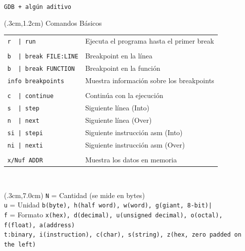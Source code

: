 \documentclass[usenames,table,dvipsnames,aspectratio=169]{beamer}
\begin{document}
\begin{frame}[fragile]{\texttt{GDB + algún aditivo}}
 \begin{textblock*}{\textwidth}(.3cm,1.2cm)
    Comandos Básicos\\
\small
\begin{tabular}{ll}
\verb;r  | run;            & Ejecuta el programa hasta el primer break\\
& \\
\verb;b  | break FILE:LINE;& Breakpoint en la línea\\
\verb;b  | break FUNCTION; & Breakpoint en la función\\
\verb;info breakpoints;    & Muestra información sobre los breakpoints\\
& \\
\verb;c  | continue;       & Continúa con la ejecución\\
\verb;s  | step;           & Siguiente línea (Into)\\
\verb;n  | next;           & Siguiente línea (Over)\\
\verb;si | stepi;          & Siguiente instrucción asm (Into)\\
\verb;ni | nexti;          & Siguiente instrucción asm (Over)\\
& \\
\verb;x/Nuf ADDR;          & Muestra los datos en memoria\\ %
  \end{tabular}\\
 \end{textblock*}
 \begin{textblock*}{\textwidth}(.3cm,7.0cm)
  \scriptsize
\hspace{.5cm} \verb;N; = Cantidad (se mide en bytes)\\
\hspace{.5cm} \verb;u; = Unidad \verb;b(byte), h(half word), w(word), g(giant, 8-bit)|;\\
\hspace{.5cm} \verb;f; = Formato \verb;x(hex), d(decimal), u(unsigned decimal), o(octal), f(float), a(address);\\
\hspace{2.1cm} \verb;t:binary, i(instruction), c(char), s(string), z(hex, zero padded on the left);\\
 \end{textblock*}
\end{frame}
\end{document}
